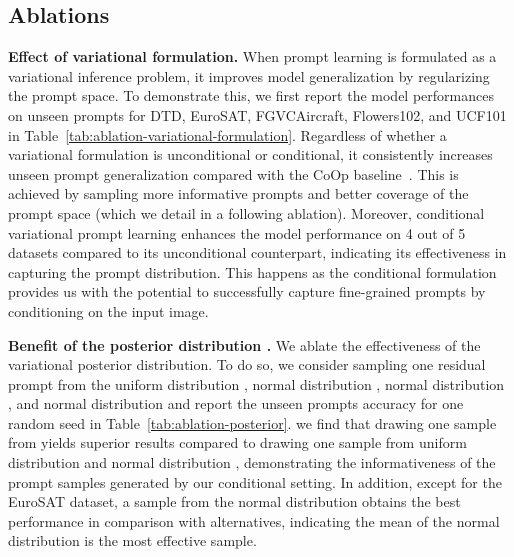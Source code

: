 \documentclass[10pt,twocolumn,letterpaper]{article}
\begin{document}
\subsection{Ablations}
\label{ablation}

\textbf{Effect of variational formulation.} When prompt learning is formulated as a variational inference problem, it improves model generalization by regularizing the prompt space. To demonstrate this, we first report the model performances on unseen prompts for DTD, EuroSAT, FGVCAircraft, Flowers102, and UCF101 in Table~\ref{tab:ablation-variational-formulation}. 
Regardless of whether a variational formulation is unconditional or conditional, it consistently increases unseen prompt generalization compared with the CoOp baseline~\cite{zhou2022learning}. 
This is achieved by sampling more informative prompts  and  better coverage of the prompt space (which we detail in a following ablation). 
Moreover, conditional variational prompt learning enhances the model performance on 4 out of 5 datasets compared to its unconditional counterpart, indicating its effectiveness in capturing the prompt distribution. This happens as the conditional formulation provides us with the potential to successfully capture fine-grained prompts by conditioning on the input image.


\textbf{Benefit of the posterior distribution .}
We ablate the effectiveness of the variational posterior distribution. To do so, we consider sampling one residual prompt from the uniform distribution 
, normal distribution , 
normal distribution , and normal distribution  and report the unseen prompts accuracy for one random seed in Table~\ref{tab:ablation-posterior}. 
we find that drawing one sample from  yields superior results compared to drawing one sample from uniform distribution  and normal distribution , demonstrating the informativeness of the prompt samples generated by our conditional setting.
In addition, except for the EuroSAT dataset, a sample from the normal distribution  obtains the best performance in comparison with alternatives, indicating the mean of the normal distribution  is the most effective sample. 
\end{document}
